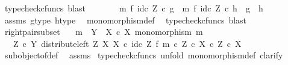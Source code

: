 \begin{isabellebody}
\ {\isacharparenleft}{\kern0pt}typecheck{\isacharunderscore}{\kern0pt}cfuncs{\isacharcomma}{\kern0pt}\ blast{\isacharparenright}{\kern0pt}\isanewline
\ \ \ \ \isamarkupfalse%
\ \isamarkupfalse%
\ {\isachardoublequoteopen}{\isacharparenleft}{\kern0pt}m\ {\isasymtimes}\isactrlsub f\ id\isactrlsub c\ Z{\isacharparenright}{\kern0pt}\ {\isasymcirc}\isactrlsub c\ g\ {\isacharequal}{\kern0pt}\ {\isacharparenleft}{\kern0pt}m\ {\isasymtimes}\isactrlsub f\ id\isactrlsub c\ Z{\isacharparenright}{\kern0pt}\ {\isasymcirc}\isactrlsub c\ h\ {\isasymLongrightarrow}\ g\ {\isacharequal}{\kern0pt}\ h{\isachardoublequoteclose}\isanewline
\ \ \ \ \ \ \isamarkupfalse%
\ assms\ g{\isacharunderscore}{\kern0pt}type\ h{\isacharunderscore}{\kern0pt}type\ \isamarkupfalse%
\ monomorphism{\isacharunderscore}{\kern0pt}def{}\ \isamarkupfalse%
\ {\isacharparenleft}{\kern0pt}typecheck{\isacharunderscore}{\kern0pt}cfuncs{\isacharcomma}{\kern0pt}\ blast{\isacharparenright}{\kern0pt}\isanewline
\ \ \isamarkupfalse%
\isanewline
{}\isamarkupfalse%
%
\endisatagproof
{\isafoldproof}%
%
\isadelimproof
\isanewline
%
\endisadelimproof
\isanewline
{}\isamarkupfalse%
\ right{\isacharunderscore}{\kern0pt}pair{\isacharunderscore}{\kern0pt}subset{\isacharcolon}{\kern0pt}\isanewline
\ \ \ {\isachardoublequoteopen}m\ {\isacharcolon}{\kern0pt}\ Y\ {\isasymrightarrow}\ X\ {\isasymtimes}\isactrlsub c\ X{\isachardoublequoteclose}\ {\isachardoublequoteopen}monomorphism\ m{\isachardoublequoteclose}\isanewline
\ \ \ {\isachardoublequoteopen}{\isacharparenleft}{\kern0pt}Z\ {\isasymtimes}\isactrlsub c\ Y{\isacharcomma}{\kern0pt}\ distribute{\isacharunderscore}{\kern0pt}left\ Z\ X\ X\ {\isasymcirc}\isactrlsub c\ {\isacharparenleft}{\kern0pt}id\isactrlsub c\ Z\ {\isasymtimes}\isactrlsub f\ m{\isacharparenright}{\kern0pt}{\isacharparenright}{\kern0pt}\ {\isasymsubseteq}\isactrlsub c\ {\isacharparenleft}{\kern0pt}Z\ {\isasymtimes}\isactrlsub c\ X{\isacharparenright}{\kern0pt}\ {\isasymtimes}\isactrlsub c\ {\isacharparenleft}{\kern0pt}Z\ {\isasymtimes}\isactrlsub c\ X{\isacharparenright}{\kern0pt}{\isachardoublequoteclose}\isanewline
%
\isadelimproof
\ \ %
\endisadelimproof
%
\isatagproof
{}\isamarkupfalse%
\ subobject{\isacharunderscore}{\kern0pt}of{\isacharunderscore}{\kern0pt}def{}\ \isamarkupfalse%
\ assms\isanewline
{}\isamarkupfalse%
\ {\isacharparenleft}{\kern0pt}typecheck{\isacharunderscore}{\kern0pt}cfuncs{\isacharcomma}{\kern0pt}\ unfold\ monomorphism{\isacharunderscore}{\kern0pt}def{}{\isacharcomma}{\kern0pt}\ clarify{\isacharparenright}{\kern0pt}\isanewline

\end{isabellebody}
